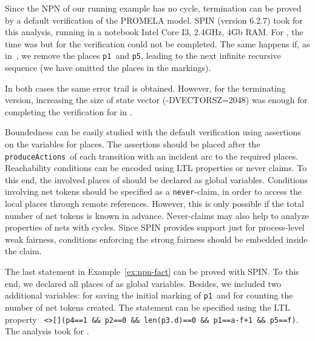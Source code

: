 \documentclass{llncs}
\begin{document}
\begin{example}
\label{ex:spin-prop1-fact}
Since the NPN of our running example has no cycle, termination can be proved by a default verification of the PROMELA model. SPIN (version 6.2.7) took  for this analysis, running in a notebook Intel Core I3, 2.4GHz, 4Gb RAM. For , the time was  but for  the verification could not be completed. The same happens if, as in~\cite{Lomazova01}, we remove the places \small\verb"p1"\nfont\ and \small\verb"p5"\nfont, leading to the next infinite recursive sequence (we have omitted the places in the markings).

\vspace{7pt}










\vspace{7pt}

In both cases the same error trail is obtained. However, for the terminating version, increasing the size of state vector (-DVECTORSZ=2048) was enough for completing the verification for  in .
\end{example}



Boundedness can be easily studied with the default verification using assertions on the variables for places. The assertions should be placed after the \small\verb"produceActions"\nfont\ of each transition with an incident arc to the required places. Reachability conditions can be encoded using LTL properties or never claims. To this end, the involved places of  should be declared as global variables. Conditions involving net tokens should be specified as  a \small\texttt{never}\nfont-claim, in order to access the local places through remote references. However, this is only possible if the total number of net tokens is known in advance. Never-claims may also help to analyze properties of nets with cycles. Since SPIN  provides support just for process-level weak fairness, conditions enforcing the strong fairness should be embedded inside the claim.

\begin{example}
The last statement in Example~\ref{ex:npn-fact} can be proved with SPIN. To this end, we declared all places of  as global variables. Besides, we included two additional variables:  for saving the initial marking of \small\verb"p1"\nfont\ and  for counting the number of net tokens created. The statement can be specified using the LTL property \small\verb" <>[](p4==1 && p2==0 && len(p3.d)==0 && p1==a-f+1 && p5==f)"\nfont. The analysis took  for  .
\end{example}
\end{document}
